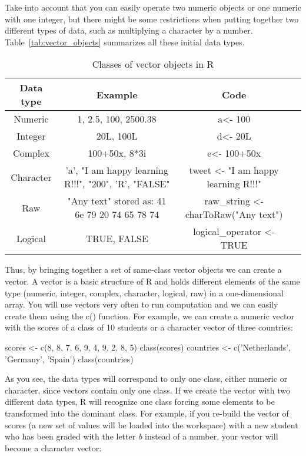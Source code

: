 Take into account that you can easily operate two numeric objects or one numeric with one integer, but there might be some restrictions when putting together two different types of data, such as multiplying a character by a number. Table~\ref{tab:vector_objects} summarizes all these initial data types.

\begin{table}[ht]
\label{tab:vector_objects}
\caption{Classes of vector objects in R}
\centering
\begin{tabular}{c c c p{2cm}}
\hline\hline
Data type & Example & Code \\ [0.5ex]
\hline
Numeric&1, 2.5, 100, 2500.38& a\textless- 100 \\
Integer&20L, 100L&d\textless- 20L \\
Complex& 100+50x, 8*3i &e\textless- 100+50x \\
Character&   \parbox[t]{4cm}{\centering 'a', "I am happy learning R!!!", "200", 'R', "FALSE"} & tweet \textless- "I am happy learning R!!!" \\
Raw& \parbox[t]{4cm}{\centering "Any text" stored as:  41 6e 79 20 74 65 78 74} & raw\_string \textless- charToRaw("Any text") \\
Logical& TRUE, FALSE & logical\_operator \textless- TRUE  \\ [1ex]
\hline
\end{tabular}
\label{table:nonlin}
\end{table}

Thus, by bringing together a set of same-class vector objects we can create a vector. A vector is a basic structure of R and holds different elements of the same type (numeric, integer, complex, character, logical, raw) in a one-dimensional array.	You will use vectors very often to run computation and we can easily create them using the c() function. For example, we can create a numeric vector with the scores of a class of 10 students or a character vector of three countries:

\begin{exampler}
scores <- c(8, 8, 7, 6, 9, 4, 9, 2, 8, 5)
class(scores)
countries <- c('Netherlands', 'Germany', 'Spain')
class(countries)
\end{exampler}
 
As you see, the data types will correspond to only one class, either numeric or character, since vectors contain only one class. If we create the vector with two different data types, R will recognize one class forcing some elements to be transformed into the dominant class. For example, if you re-build the vector of scores (a new set of values will be loaded into the workspace) with a new student who has been graded with the letter \emph{b} instead of a number, your vector will become a character vector:

